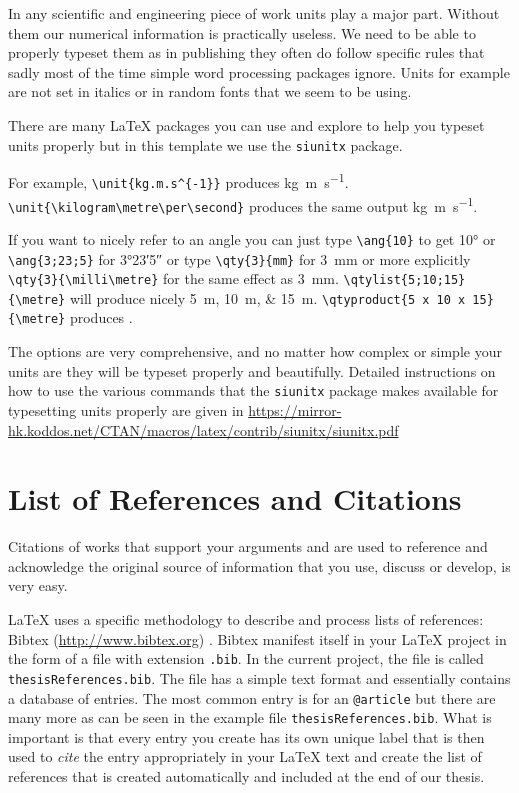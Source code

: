 \documentclass[11pt,twoside,openright]{report}
\begin{document}
In any scientific and engineering piece of work units play a major part. Without them our numerical information is practically useless. We need to be able to properly typeset them as in publishing they often do follow specific rules that sadly most of the time simple word processing packages ignore. Units for example are not set in italics or in random fonts that we seem to be using.

There are many \LaTeX{} packages you can use and explore to help you typeset units properly but in this template we use the \verb|siunitx| package. 

For example, \verb|\unit{kg.m.s^{-1}}| produces \unit{kg.m.s^{-1}}.  \verb|\unit{\kilogram\metre\per\second}| produces the same output \unit{\kilogram\metre\per\second}.

If you want to nicely refer to an angle you can just type \verb|\ang{10}| to get \ang{10} or \verb|\ang{3;23;5}| for \ang{3;23;5} or type \verb|\qty{3}{mm}| for \qty{3}{mm} or more explicitly \verb|\qty{3}{\milli\metre}| for the same effect as \qty{3}{\milli\metre}. 
\verb|\qtylist{5;10;15}{\metre}| will produce nicely \qtylist{5;10;15}{\metre}. 
\verb|\qtyproduct{5 x 10 x 15}{\metre}| produces .


The options are very comprehensive, and no matter how complex or simple your units are they will be typeset properly and beautifully.
Detailed instructions on how to use the various commands that the \verb|siunitx| package makes available for typesetting units properly are given in \url{https://mirror-hk.koddos.net/CTAN/macros/latex/contrib/siunitx/siunitx.pdf}



\section{List of References and Citations}
\label{sec:References}

Citations of works that support your arguments and are used to reference and acknowledge the original source of information that you use, discuss or develop, is very easy. 


\LaTeX{} uses a specific methodology to describe and process lists of references: Bibtex (\url{http://www.bibtex.org}) .
Bibtex manifest itself in your \LaTeX{} project in the form of a file with extension \verb|.bib|. 
In the current project, the file is called \verb|thesisReferences.bib|.
The file has a simple text format and essentially contains a database of entries.
The most common entry is for an \verb|@article| but there are many more as can be seen in the example file \verb|thesisReferences.bib|. 
What is important is that every entry you create has its own unique label that is then used to \emph{cite} the entry appropriately in your \LaTeX{} text and create the list of references that is created automatically and included at the end of our thesis.
\end{document}
